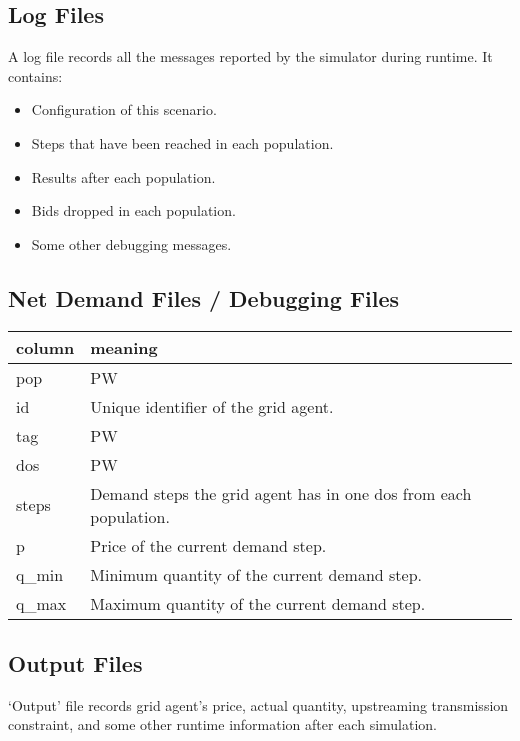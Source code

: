 \documentclass[12pt]{article}
\begin{document}
\subsection{Log Files}
\label{subsec:output_log}

A log file records all the messages reported by the simulator during runtime. 
It contains: 
\begin{itemize}
    \item{Configuration of this scenario.}
    \item{Steps that have been reached in each population.}
    \item{Results after each population.}
    \item{Bids dropped in each population.}
    \item{Some other debugging messages.}
\end{itemize}

\subsection{Net Demand Files / Debugging Files}
\label{subsec:output_netdemand}

\bigskip
\noindent
\begin{tabular} {| l | l |}
    \hline
    \textbf{column} & \textbf{meaning} \\ \hline
    pop & PW \\ \hline
    id & Unique identifier of the grid agent. \\ \hline
    tag & PW \\ \hline
    dos & PW \\ \hline
    steps & Demand steps the grid agent has in one dos from each population. \\ \hline
    p & Price of the current demand step. \\ \hline
    q\_min & Minimum quantity of the current demand step. \\ \hline
    q\_max & Maximum quantity of the current demand step. \\ \hline
\end{tabular}

\subsection{Output Files}
\label{subsec:output_output}

`Output' file records grid agent's price, actual quantity, upstreaming transmission constraint, 
and some other runtime information after each simulation. 
\end{document}
